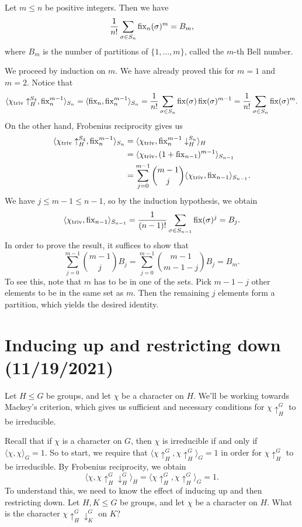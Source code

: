 \begin{prop}{}
    Let $m \leq n$ be positive integers. Then we have 
    \[ \frac{1}{n!} \sum_{\sigma \in S_n} \operatorname{fix}_n(\sigma)^m = B_m, \] 
    where $B_m$ is the number of partitions of $\{1, \dots, m\}$, called the 
    $m$-th Bell number. 
\end{prop}
\begin{pf}
    We proceed by induction on $m$. We have already proved this for $m = 1$ 
    and $m = 2$. Notice that 
    \[ \langle \chi_{\operatorname{triv}} \uparrow_H^{S_4}, \operatorname{fix}_n^{m-1} \rangle_{S_n} 
    = \langle \operatorname{fix}_n, \operatorname{fix}_n^{m-1} \rangle_{S_n} = \frac{1}{n!} 
    \sum_{\sigma \in S_n} \operatorname{fix}(\sigma) \operatorname{fix}(\sigma)^{m-1} 
    = \frac{1}{n!} \sum_{\sigma \in S_n} \operatorname{fix}(\sigma)^m. \] 
    On the other hand, Frobenius reciprocity gives us 
    \begin{align*}
        \langle \chi_{\operatorname{triv}} \uparrow_H^{S_4}, \operatorname{fix}_n^{m-1} \rangle_{S_n} 
        &= \langle \chi_{\operatorname{triv}}, \operatorname{fix}_n^{m-1} \downarrow_H^{S_n} \rangle_H \\
        &= \langle \chi_{\operatorname{triv}}, (1 + \operatorname{fix}_{n-1})^{m-1} \rangle_{S_{n-1}} \\
        &= \sum_{j=0}^{m-1} \binom{m-1}{j} \langle \chi_{\operatorname{triv}}, \operatorname{fix}_{n-1} \rangle_{S_{n-1}}. 
    \end{align*}
    We have $j \leq m-1 \leq n-1$, so by the induction hypothesis, we obtain 
    \[ \langle \chi_{\operatorname{triv}}, \operatorname{fix}_{n-1} \rangle_{S_{n-1}} 
    = \frac{1}{(n-1)!} \sum_{\sigma \in S_{n-1}} \operatorname{fix}(\sigma)^j = B_j. \] 
    In order to prove the result, it suffices to show that 
    \[ \sum_{j=0}^{m-1} \binom{m-1}{j} B_j = \sum_{j=0}^{m-1} \binom{m-1}{m-1-j} B_j = B_m. \] 
    To see this, note that $m$ has to be in one of the sets. Pick $m - 1 - j$ 
    other elements to be in the same set as $m$. Then the remaining $j$ 
    elements form a partition, which yields the desired identity. 
\end{pf}

\section{Inducing up and restricting down (11/19/2021)}
Let $H \leq G$ be groups, and let $\chi$ be a character on $H$. 
We'll be working towards Mackey's criterion, which gives us sufficient 
and necessary conditions for $\chi \uparrow_H^G$ to be irreducible. 

Recall that if $\chi$ is a character on $G$, then $\chi$ is irreducible 
if and only if $\langle \chi, \chi \rangle_G = 1$. So to start, we 
require that $\langle \chi \uparrow_H^G, \chi \uparrow_H^G \rangle_G = 1$
in order for $\chi \uparrow_H^G$ to be irreducible. By Frobenius reciprocity, 
we obtain 
\[ \langle \chi, \chi \uparrow_H^G \downarrow_H^G \rangle_H = 
\langle \chi \uparrow_H^G, \chi \uparrow_H^G \rangle_G = 1. \] 
To understand this, we need to know the effect of inducing up and then 
restricting down. Let $H, K \leq G$ be groups, and let $\chi$ be a character 
on $H$. What is the character $\chi \uparrow_H^G \downarrow_K^G$ on $K$? 

